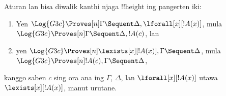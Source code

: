 \documentclass[../../../include/open-logic-section]{subfiles}
\begin{document}
\begin{lem}
Aturan \RightR{\lforall} lan \LeftR{\lexists} bisa diwalik
kanthi njaga !!{height} ing pangerten iki:
\begin{enumerate}
  \item Yen $\Log{G3c} \Proves[n] \Gamma \Sequent \Delta,
  \lforall[x][!A(x)]$, mula $\Log{G3c} \Proves[n] \Gamma \Sequent
  \Delta, !A(c)$, lan
  \item yen $\Log{G3c} \Proves[n] \lexists[x][!A(x)], \Gamma \Sequent
  \Delta$, mula $\Log{G3c} \Proves[n] !A(c), \Gamma \Sequent \Delta$,
\end{enumerate}
kanggo saben $c$ sing ora ana ing $\Gamma$, $\Delta$, lan
$\lforall[x][!A(x)]$ utawa $\lexists[x][!A(x)]$, manut urutane.
\end{lem}
\end{document}
